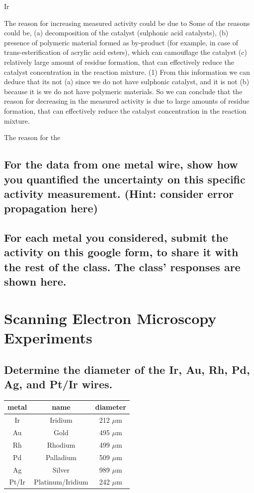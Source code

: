 Ir\documentclass{article}
\begin{document}
The reason for increasing measured activity could be due to 
Some of the reasons could be, (a) decomposition of the catalyst (sulphonic acid catalysts), (b) presence of polymeric material formed as by-product (for example, in case of trans-esterification of acrylic acid esters), which can camouflage the catalyst  (c) relatively large amount of residue formation, that can effectively reduce the catalyst concentration in the reaction mixture. (1) From this information we can deduce that its not (a) since we do not have sulphonic catalyst, and it is not (b) because it is we do not have polymeric materials. So we can conclude that the reason for decreasing in the measured activity is due to large amounts of residue formation, that can effectively reduce the catalyst concentration in the reaction mixture.


The reason for the 

\subsection{For the data from one metal wire, show how you quantified the uncertainty on
this specific activity measurement. (Hint: consider error propagation here)}

\subsection{For each metal you considered, submit the activity on this google form, to
share it with the rest of the class. The class’ responses are shown here.}

\section{Scanning Electron Microscopy Experiments}

\subsection{Determine the diameter of the Ir, Au, Rh, Pd, Ag, and Pt/Ir wires.}
\begin{center}
\begin{tabular}{ |c|c|c| } 
 \hline
 metal & name & diameter \\
\hline
 Ir & Iridium & 212 $\mu$m  \\
 Au & Gold &495 $\mu$m \\
 Rh & Rhodium & 499 $\mu$m  \\
 Pd & Palladium & 509 $\mu$m\\
 Ag & Silver & 989 $\mu$m\\
 Pt/Ir & Platinum/Iridium & 242 $\mu$m\\
 \hline 
\end{tabular}
\end{center}
\end{document}
